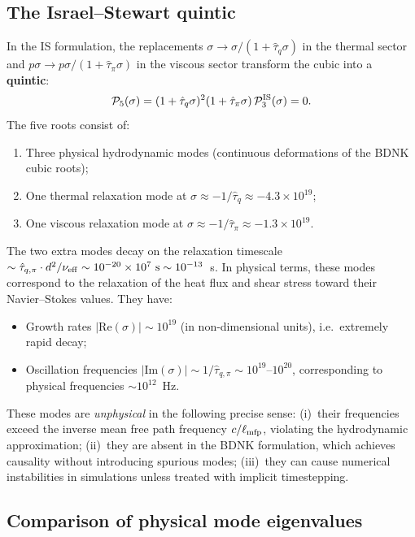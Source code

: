 \subsection{The Israel--Stewart quintic}

In the IS formulation, the replacements
$\sigma \to \sigma/(1 + \hat\tau_q\sigma)$ in the thermal sector and
$p\sigma \to p\sigma/(1 + \hat\tau_\pi\sigma)$ in the viscous sector
transform the cubic into a \textbf{quintic}:
\begin{equation}
  \mathcal{P}_5(\sigma) = (1 + \hat\tau_q\sigma)^2(1 + \hat\tau_\pi\sigma)\,
  \mathcal{P}_3^{\rm IS}(\sigma) = 0.
\end{equation}
The five roots consist of:
\begin{enumerate}
  \item Three physical hydrodynamic modes (continuous deformations of the
    BDNK cubic roots);
  \item One thermal relaxation mode at $\sigma \approx -1/\hat\tau_q
    \approx -4.3 \times 10^{19}$;
  \item One viscous relaxation mode at $\sigma \approx -1/\hat\tau_\pi
    \approx -1.3 \times 10^{19}$.
\end{enumerate}

The two extra modes decay on the relaxation timescale
$\sim \hat\tau_{q,\pi} \cdot d^2/\nu_{\rm eff}
\sim 10^{-20} \times 10^7~\text{s} \sim 10^{-13}$~s.  In physical
terms, these modes correspond to the relaxation of the heat flux and
shear stress toward their Navier--Stokes values.  They have:
\begin{itemize}
  \item Growth rates $|\mathrm{Re}(\sigma)| \sim 10^{19}$ (in
    non-dimensional units), i.e.\ extremely rapid decay;
  \item Oscillation frequencies $|\mathrm{Im}(\sigma)| \sim 1/\hat\tau_{q,\pi}
    \sim 10^{19}$--$10^{20}$, corresponding to physical frequencies
    $\sim 10^{12}$~Hz.
\end{itemize}

These modes are \emph{unphysical} in the following precise sense:
(i)~their frequencies exceed the inverse mean free path
frequency $c/\ell_{\rm mfp}$, violating the hydrodynamic
approximation; (ii)~they are absent in the BDNK formulation, which
achieves causality without introducing spurious modes; (iii)~they
can cause numerical instabilities in simulations unless treated
with implicit timestepping.

\subsection{Comparison of physical mode eigenvalues}

